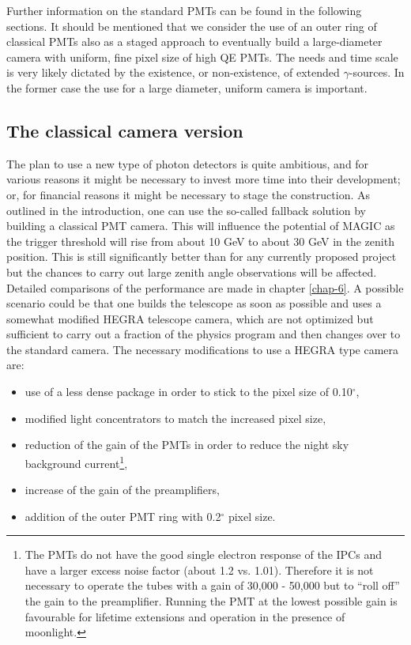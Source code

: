Further information on the standard PMTs can be found in the following
sections. It should be mentioned that we consider the use of an outer ring
of classical PMTs also as a staged approach to eventually build a
large-diameter camera with uniform, fine pixel size of high QE PMTs. The
needs and time scale is very likely dictated by the existence, or
non-existence, of extended $\gamma $-sources. In the former case the use for
a large diameter, uniform camera is important.

\subsection{The classical camera version}


\medskip The plan to use a new type of photon detectors is quite ambitious,
and for various reasons it might be necessary to invest more time into their
development; or, for financial reasons it might be necessary to stage the
construction. As outlined in the introduction, one can use the so-called
fallback solution by building a classical PMT camera. This will influence
the potential of MAGIC as the trigger threshold will rise from about
10 GeV to about 30 GeV in the zenith position. This is still significantly
better than for any currently proposed project but the chances to carry out
large zenith angle observations will be affected. Detailed comparisons
of the performance are made in chapter \ref{chap-6}. A possible scenario
could be that one builds the telescope as soon as possible and uses a
somewhat modified HEGRA telescope camera, which are not optimized but
sufficient to carry out a fraction of the physics program and then changes
over to the standard camera. The necessary modifications to use a HEGRA type
camera are:

\begin{itemize}
\item  use of a less dense package in order to stick to the pixel size of
0.10$^{\circ }$,

\item  modified light concentrators to match the increased pixel size,

\item  reduction of the gain of the PMTs in order to reduce the night sky
background current\footnote{%
The PMTs do not have the good single electron response of the IPCs and have a
larger excess noise factor (about 1.2 vs. 1.01). Therefore it is not necessary
to operate the tubes with a gain of 30,000 - 50,000 but to ``roll off'' the
gain to the preamplifier. Running the PMT at the lowest possible gain is
favourable for lifetime extensions and operation in the presence of
moonlight.},

\item  increase of the gain of the preamplifiers,

\item  addition of the outer PMT ring with 0.2$^{\circ }$ pixel size.
\end{itemize}

